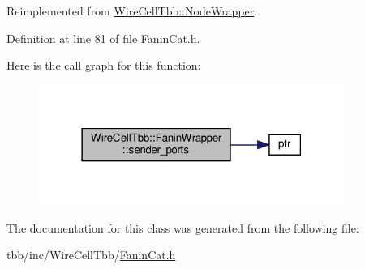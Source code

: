 Reimplemented from \hyperlink{class_wire_cell_tbb_1_1_node_wrapper_a4ed2daeddbb2f75934759ac8f9a3ce8b}{Wire\+Cell\+Tbb\+::\+Node\+Wrapper}.



Definition at line 81 of file Fanin\+Cat.\+h.

Here is the call graph for this function\+:
\nopagebreak
\begin{figure}[H]
\begin{center}
\leavevmode
\includegraphics[width=282pt]{class_wire_cell_tbb_1_1_fanin_wrapper_a03e6bbc3d8adc82c6203a72d615c1ba7_cgraph}
\end{center}
\end{figure}


The documentation for this class was generated from the following file\+:\begin{DoxyCompactItemize}
\item 
tbb/inc/\+Wire\+Cell\+Tbb/\hyperlink{_fanin_cat_8h}{Fanin\+Cat.\+h}\end{DoxyCompactItemize}
